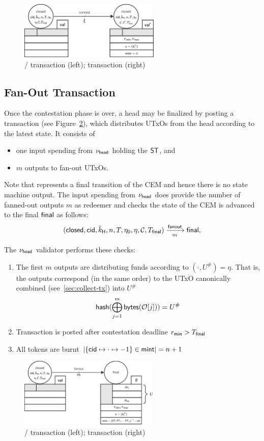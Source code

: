 \begin{figure}[h]
  \centering
  \includegraphics[width=0.6\textwidth]{figures/SM-contest.pdf}
  \caption{\mtxClose{}/\mtxContest{} transaction (left); \mtxContest{}
    transaction (right)}\label{fig:SM-contest}
\end{figure}

\subsection{Fan-Out Transaction}

\begin{samepage}
Once the contestation phase is over, a head may be finalized by posting a
\mtxFanout{} transaction (see Figure~\ref{fig:SM-fanout}), which
distributes UTxOs from the head according to the latest state. It consists of
\begin{itemize}
  \item one input spending from $\nu_\mathsf{head}$ holding the $\mathsf{ST}$, and
  \item $m$ outputs to fan-out UTxOs.
\end{itemize}
Note that \mtxFanout{} represents a final transition of the CEM and hence there
is no state machine output. The input spending from $\nu_\mathsf{head}$ does provide the
number of fanned-out outputs $m$ as redeemer and checks the state of the CEM is
advanced to the final $\mathsf{final}$ as follows:
\[
  (\mathsf{closed},\mathsf{cid},\tilde{k}_{\mathsf{H}},n,T,\eta_0,\eta,\mathcal{C},T_{\mathsf{final}}) \xrightarrow[m]{\mathsf{fanout}} \mathsf{final},
\]
\end{samepage}

\noindent The $\nu_\mathsf{head}$ validator performs these checks:
\begin{enumerate}
  \item The first $m$ outputs are distributing funds according to
        $(\cdot, U^{\#}) = \eta$. That is, the outputs correspond (in the same
        order) to the UTxO canonically combined (see~\ref{sec:collect-tx}) into
        $U^{\#}$
        \[
        \mathsf{hash}(\bigoplus_{j=1}^{m} \mathsf{bytes}(\mathcal{O}[j])) = U^{\#}
        \]
  \item Transaction is posted after contestation deadline $r_{\mathsf{min}} > T_{\mathsf{final}}$
  \item All tokens are burnt
        $|\{\mathsf{cid} \mapsto \cdot \mapsto -1\} \in \mathsf{mint}| = n + 1$
\end{enumerate}

\begin{figure}[h]
  \centering
  \includegraphics[width=0.6\textwidth]{figures/SM-fanout.pdf}
  \caption{\mtxClose{}/\mtxContest{} transaction (left);
    \mtxFanout{} transaction (right)}\label{fig:SM-fanout}
\end{figure}

